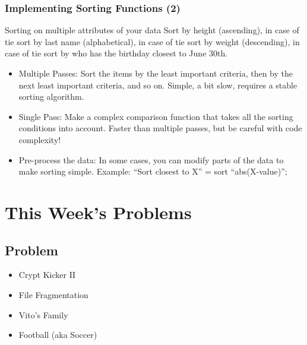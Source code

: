 \documentclass{beamer}
\begin{document}
\begin{frame}
  \frametitle{Implementing Sorting Functions (2)}
  \begin{block}{Sorting on multiple attributes of your data}
    Sort by height (ascending), in case of tie sort by last name
    (alphabetical), in case of tie sort by weight (descending), in
    case of tie sort by who has the birthday closest to June 30th.
  \end{block}
  \medskip
  \begin{itemize}
  \item<1> Multiple Passes: Sort the items by the least important
    criteria, then by the next least important criteria, and so
    on. Simple, a bit slow, requires a stable sorting algorithm.
  \item<2> Single Pass: Make a complex comparison function that takes
    all the sorting conditions into account. Faster than multiple
    passes, but be careful with code complexity!
  \item<3> Pre-process the data: In some cases, you can modify parts
    of the data to make sorting simple. Example: ``Sort closest to X''
    = sort ``abs(X-value)'';
  \end{itemize}
\end{frame}

\section{This Week's Problems}

\subsection{Problem}
\begin{frame}
  \begin{itemize}
  \item Crypt Kicker II
  \item File Fragmentation
  \item Vito's Family
  \item Football (aka Soccer)
  \end{itemize}
\end{frame}
\end{document}
